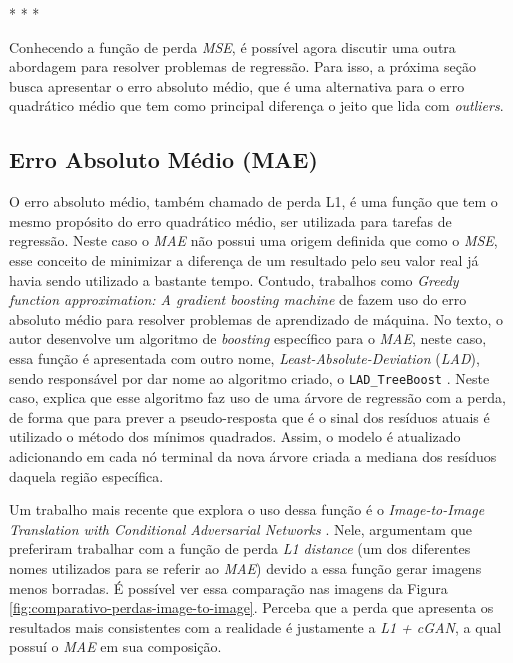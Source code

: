 \medskip
\begin{center}
 * * *
\end{center}
\medskip

Conhecendo a função de perda \textit{MSE}, é possível agora discutir uma outra abordagem para resolver problemas de regressão. Para isso, a próxima seção busca apresentar o erro absoluto médio, que é uma alternativa para o erro quadrático médio que tem como principal diferença o jeito que lida com \textit{outliers}.

\subsection{Erro Absoluto Médio (MAE)} 

O erro absoluto médio, também chamado de perda L1, é uma função que tem o mesmo propósito do erro quadrático médio, ser utilizada para tarefas de regressão. Neste caso o \textit{MAE} não possui uma origem definida que como o \textit{MSE}, esse conceito de minimizar a diferença de um resultado pelo seu valor real já havia sendo utilizado a bastante tempo. Contudo, trabalhos como \textit{Greedy function approximation: A gradient boosting machine} de \textcite{GreedyFunctionApproximation} fazem uso do erro absoluto médio para resolver problemas de aprendizado de máquina. No texto, o autor desenvolve um algoritmo de \textit{boosting} específico para o \textit{MAE}, neste caso, essa função é apresentada com outro nome, \textit{Least-Absolute-Deviation} (\textit{LAD}), sendo responsável por dar nome ao algoritmo criado, o \texttt{LAD\_TreeBoost} \parencite{GreedyFunctionApproximation}. Neste caso, \textcite{GreedyFunctionApproximation} explica que esse algoritmo faz uso de uma árvore de regressão com a perda, de forma que para prever a pseudo-resposta que é o sinal dos resíduos atuais é utilizado o método dos mínimos quadrados. Assim, o modelo é atualizado adicionando em cada nó terminal da nova árvore criada a mediana dos resíduos daquela região específica.

Um trabalho mais recente que explora o uso dessa função é o \textit{Image-to-Image Translation with Conditional Adversarial Networks} \parencite{ImageToImage}. Nele, \textcite{ImageToImage} argumentam que preferiram trabalhar com a função de perda \textit{L1 distance} (um dos diferentes nomes utilizados para se referir ao \textit{MAE}) devido a essa função gerar imagens menos borradas. É possível ver essa comparação nas imagens da Figura \ref{fig:comparativo-perdas-image-to-image}. Perceba que a perda que apresenta os resultados mais consistentes com a realidade é justamente a \textit{L1 + cGAN}, a qual possuí o \textit{MAE} em sua composição.

